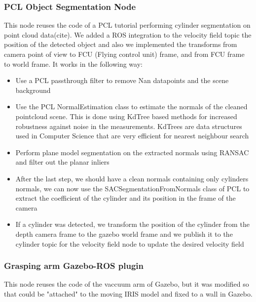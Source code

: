 \subsubsection{PCL Object Segmentation Node}
This node reuses the code of a PCL tutorial performing cylinder segmentation on point cloud data(cite). 
We added a ROS integration to the velocity field topic the position of the detected object and also we implemented the transforms from camera point of view to FCU (Flying control unit) frame, and from FCU frame to world frame. 
It works in the following way:
\begin{itemize}
    \item Use a PCL passthrough filter to remove Nan datapoints and the scene background
    \item Use the PCL NormalEstimation class to estimate the normals of the cleaned pointcloud scene. This is done using KdTree based methods for increased robustness against noise in the measurements. KdTrees are data structures used in Computer Science that are very efficient for nearest neighbour search
    \item Perform plane model segmentation on the extracted normals using RANSAC and filter out the planar inliers
    \item After the last step, we should have a clean normals containing only cylinders normals, we can now use the SACSegmentationFromNormals class of PCL to extract the coefficient of the cylinder and its position in the frame of the camera
    \item If a cylinder was detected, we transform the position of the cylinder from the depth camera frame to the gazebo world frame and we publish it to the cylinder topic for the velocity field node to update the desired velocity field
\end{itemize}
\subsubsection{Grasping arm Gazebo-ROS plugin}    
This node reuses the code of the vaccuum arm of Gazebo, but it was modified so that could be "attached" to the moving IRIS model and fixed to a wall in Gazebo. 

